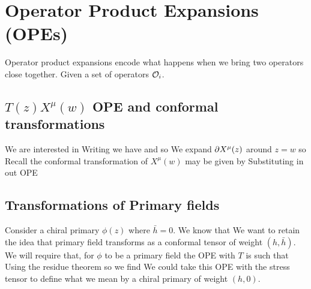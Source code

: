 \documentclass{article}
\begin{document}
\section{Operator Product Expansions (OPEs)}
Operator product expansions encode what happens when we bring two operators close together. Given a set of operators $\mathcal{O}_i$. 

\subsection{\texorpdfstring{$T(z) X^\mu(w)$}{T} OPE and conformal transformations}

We are interested in 
Writing 
we have 
and so  
We expand $\partial X^\mu (z) $ around $z=w$ 
so 
Recall the conformal transformation of $X^\mu(w) $ may be given by 
Substituting in out OPE 

\subsection{Transformations of Primary fields}
Consider a chiral primary $\phi(z)$ where $\bar{h}=0$. We know that 
We want to retain the idea that  primary field transforms as a conformal tensor of weight $(h,\bar{h})$. We will require that, for $\phi$ to be a primary field the OPE with $T$ is such that 
Using the residue theorem 
so we find 
We could take this OPE with the stress tensor to define what we mean by a chiral primary of weight $(h,0)$. 
\end{document}
